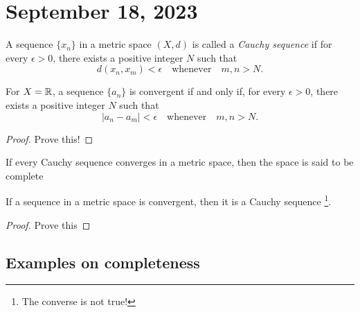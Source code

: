 \newpage
\section{September 18, 2023}
\begin{definition}
    A sequence \( \{ x_n \} \) in a metric space \( (X, d) \) is called a \textit{Cauchy sequence} if for every \( \epsilon > 0 \), there exists a positive integer \( N \) such that
    \[
    d(x_n, x_m) < \epsilon \quad \text{whenever} \quad m, n > N.
    \]
    
\end{definition}

\begin{theorem}
    For $X = \mathbb R$, a sequence \( \{ a_n \} \) is convergent if and only if, for every \( \epsilon > 0 \), there exists a positive integer \( N \) such that
    \[
    | a_n - a_m | < \epsilon \quad \text{whenever} \quad m, n > N.
    \]
\end{theorem}
\begin{proof}
    Prove this!
\end{proof}
\begin{definition}
    If every Cauchy sequence converges in a metric space, then the space is said to be complete 
\end{definition}

\begin{theorem}
    If a sequence in a metric space is convergent, then it is a Cauchy sequence \footnote{The converse is not true!}.
\end{theorem}
\begin{proof}
    Prove this
\end{proof}

\subsection{Examples on completeness}
